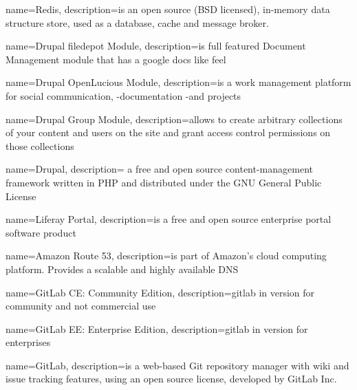 
{
	name={Redis},
	description={is an open source (BSD licensed), in-memory data structure store, used as a database, cache and message broker. \cite{bib:redis}}
}

{
	name={Drupal filedepot Module},
	description={is full featured Document Management module that has a google docs like feel \cite{bib:drupal-module-filedepot}}
}

{
	name={Drupal OpenLucious Module},
	description={is a work management platform for social communication, -documentation -and projects \cite{bib:drupal-module-openlucious}}
}


{
	name={Drupal Group Module},
	description={allows to create arbitrary collections of your content and users on the site and grant access control permissions on those collections \cite{bib:drupal-module-group}}
}

{
	name={Drupal},
	description={ a free and open source content-management framework written in PHP and distributed under the GNU General Public License}
}

{
	name={Liferay Portal},
	description={is a free and open source enterprise portal software product}
}

{
	name={Amazon Route 53},
	description={is part of Amazon's cloud computing platform. Provides a scalable and highly available \gls{DNS}}
}

{
	name={GitLab CE: Community Edition},
	description={\gls{gitlab} in version for community and not commercial use}
}

{
	name={GitLab EE: Enterprise Edition},
	description={\gls{gitlab} in version for enterprises}
}

{
	name={GitLab},
	description={is a web-based Git repository manager with wiki and issue tracking features, using an open source license, developed by GitLab Inc. \cite{bib:gitlab-wiki}}
}

